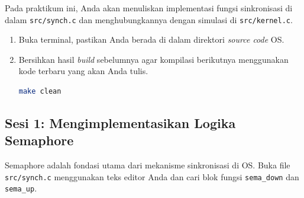 Pada praktikum ini, Anda akan menuliskan implementasi fungsi sinkronisasi di dalam \texttt{src/synch.c} dan menghubungkannya dengan simulasi di \texttt{src/kernel.c}.

\begin{enumerate}
	\item Buka terminal, pastikan Anda berada di dalam direktori \textit{source code} OS.
	\item Bersihkan hasil \textit{build} sebelumnya agar kompilasi berikutnya menggunakan kode terbaru yang akan Anda tulis.
	      \begin{lstlisting}[language=bash, caption={Bersihkan build sebelumnya}]
make clean
    \end{lstlisting}
\end{enumerate}

\subsection{Sesi 1: Mengimplementasikan Logika Semaphore}
\label{sec:m10-sesi-1}

Semaphore adalah fondasi utama dari mekanisme sinkronisasi di OS. Buka file \texttt{src/synch.c} menggunakan teks editor Anda dan cari blok fungsi \texttt{sema\_down} dan \texttt{sema\_up}.

